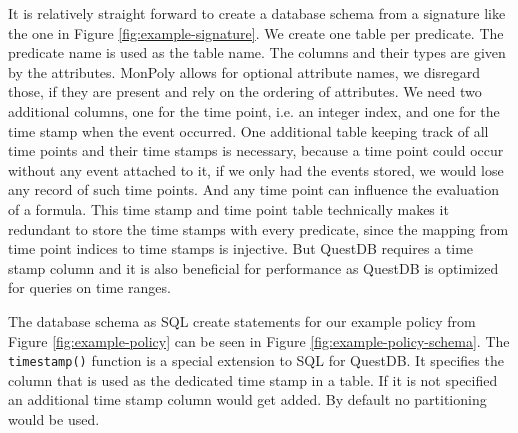 It is relatively straight forward to create a database schema from a signature like the one in Figure \ref{fig:example-signature}.
We create one table per predicate.
The predicate name is used as the table name.
The columns and their types are given by the attributes.
MonPoly allows for optional attribute names, we disregard those, if they are present and rely on the ordering of attributes.
We need two additional columns, one for the time point, i.e. an integer index, and one for the time stamp when the event occurred.
One additional table keeping track of all time points and their time stamps is necessary, because a time point could occur without any event attached to it, if we only had the events stored, we would lose any record of such time points.
And any time point can influence the evaluation of a formula.
This time stamp and time point table technically makes it redundant to store the time stamps with every predicate, since the mapping from time point indices to time stamps is injective.
But QuestDB requires a time stamp column and it is also beneficial for performance as QuestDB is optimized for queries on time ranges.

The database schema as SQL create statements for our example policy from Figure \ref{fig:example-policy} can be seen in Figure \ref{fig:example-policy-schema}.
The \texttt{timestamp()} function is a special extension to SQL for QuestDB.
It specifies the column that is used as the dedicated time stamp in a table.
If it is not specified an additional time stamp column would get added.
By default no partitioning would be used.

